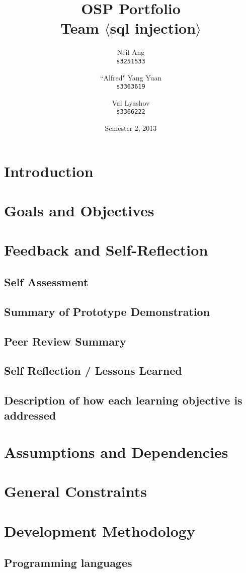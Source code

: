 \documentclass[11pt,a4paper,titlepage]{report}
\title{OSP Portfolio \\ Team $\langle$sql injection$\rangle$}
\author{
  Neil Ang\\
  \texttt{s3251533}
  \and
  ``Alfred" Yang Yuan\\
  \texttt{s3363619}
  \and
  Val Lyashov\\
  \texttt{s3366222}
}
\date{Semester 2, 2013}
\begin{document}
\maketitle

\pagebreak
\tableofcontents
\thispagestyle{empty}
\pagebreak

\section{Introduction}



\section{Goals and Objectives}
\section{Feedback and Self-Reﬂection}
\subsection{Self Assessment}
\subsection{Summary of Prototype Demonstration}
\subsection{Peer Review Summary}
\subsection{Self Reﬂection / Lessons Learned}
\subsection{Description of how each learning objective is addressed}
\section{Assumptions and Dependencies}
\section{General Constraints}
\section{Development Methodology}
\subsection{Programming languages}
\end{document}
